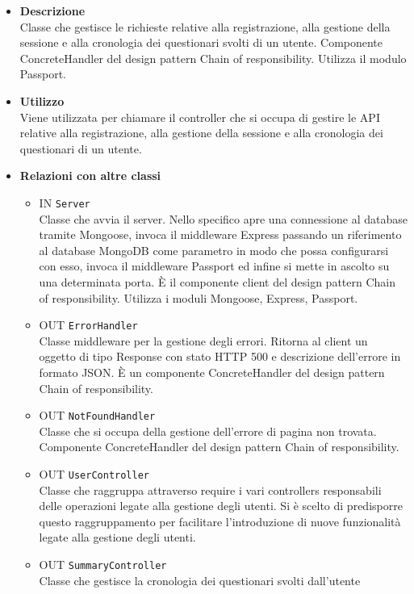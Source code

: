 	\begin{itemize}
		\item \textbf{Descrizione} \\
		Classe che gestisce le richieste relative alla registrazione, alla gestione della sessione e alla cronologia dei questionari svolti di un utente.
Componente ConcreteHandler del design pattern Chain of responsibility. Utilizza il modulo
Passport.
		\item \textbf{Utilizzo} \\
		Viene utilizzata per chiamare il controller che si occupa di gestire le API relative alla registrazione, alla gestione della sessione e alla cronologia dei questionari di un utente.
		\item \textbf{Relazioni con altre classi} 
		\begin{itemize}
		\item 
			IN	\texttt{Server}\\
			Classe che avvia il server. Nello specifico apre una connessione al database tramite Mongoose, invoca il middleware Express passando un riferimento al database MongoDB come parametro in modo che possa configurarsi con esso, invoca il middleware Passport ed infine si mette in ascolto su una determinata porta. È il componente client del design pattern Chain of responsibility. Utilizza i moduli Mongoose, Express, Passport. 
		\item 
			OUT \texttt{ErrorHandler}\\
			Classe middleware per la gestione degli errori. Ritorna al client un oggetto di tipo Response con stato HTTP 500 e descrizione dell’errore in formato JSON. È un
componente ConcreteHandler del design pattern Chain of responsibility.
		\item 
			OUT \texttt{NotFoundHandler}\\
			Classe che si occupa della gestione dell’errore di pagina non trovata. Componente ConcreteHandler del design pattern Chain of responsibility.
		\item 
			OUT \texttt{UserController}\\
			Classe che raggruppa attraverso require i vari controllers responsabili delle operazioni legate alla gestione degli utenti. Si è scelto di predisporre questo raggruppamento per facilitare l'introduzione di nuove funzionalità legate alla gestione degli utenti.
		\item 
			OUT \texttt{SummaryController}\\
			Classe che gestisce la cronologia dei questionari svolti dall'utente
	\end{itemize}

\end{itemize}
